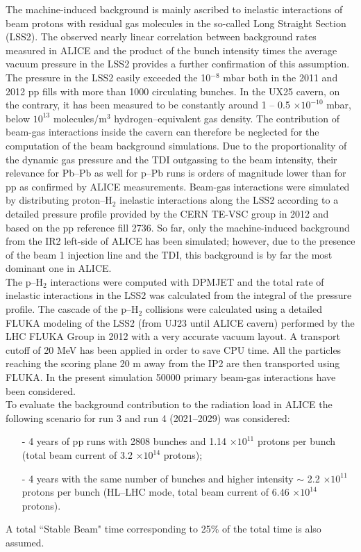 The machine-induced background is mainly ascribed to inelastic interactions of beam protons with residual gas molecules in the so-called Long Straight Section (LSS2). The observed nearly linear correlation between background rates measured in ALICE and the product of the bunch intensity times the average vacuum pressure in the LSS2 provides a further confirmation of this assumption.
The pressure in the LSS2 easily exceeded the 10$^{-8}$ mbar both in the 2011 and 2012 pp fills with more than 1000 circulating bunches. In the UX25 cavern, on the contrary, it has been measured to be constantly around 1 -- 0.5 $\times 10^{-10}$ mbar, below $10^{13}$ molecules/m$^3$ hydrogen--equivalent gas density. The contribution of beam-gas interactions inside the cavern can therefore be neglected for the computation of the beam background simulations. Due to the proportionality of the dynamic gas pressure and the TDI outgassing to the beam intensity, their relevance for Pb--Pb as well for p--Pb runs is orders of magnitude lower than for pp as confirmed by ALICE measurements. 
Beam-gas interactions were simulated by distributing proton--H$_2$ inelastic interactions along the LSS2 according to a detailed pressure profile provided by the CERN TE-VSC group in 2012 and based on the pp reference fill 2736. So far, only the machine-induced background from the IR2 left-side of ALICE has been simulated; however, due to the presence of the beam 1 injection line and the TDI, this background is by far the most dominant one in ALICE.\\
The p--H$_2$ interactions were computed with DPMJET \cite{dpmjet} and the total rate of inelastic interactions in the LSS2 was calculated from the integral of the pressure profile. The cascade of the p--H$_2$ collisions were calculated using a detailed FLUKA modeling of the LSS2 (from UJ23 until ALICE cavern) performed by the LHC FLUKA Group in 2012 with a very accurate vacuum layout. A transport cutoff of 20 MeV has been applied in order to save CPU time. All the particles reaching the scoring plane 20 m away from the IP2 are then transported using FLUKA. In the present simulation 50000 primary beam-gas interactions have been considered.\\ 
To evaluate the background contribution to the radiation load in ALICE the following scenario for {\sc run} 3 and {\sc run}  4 (2021--2029) was considered:
\begin{itemize} 
\item[-] 4 years of pp runs with 2808 bunches and 1.14 $\times 10^{11}$ protons per bunch (total beam current of 3.2 $\times 10^{14}$ protons);
\item[-] 4 years with the same number of bunches and higher intensity $\sim$ 2.2 $\times 10^{11}$ protons per bunch (HL--LHC mode, total beam current of 6.46 $\times 10^{14}$ protons). 
\end{itemize}
A total ``Stable Beam" time corresponding to 25\% of the total time is also assumed.

